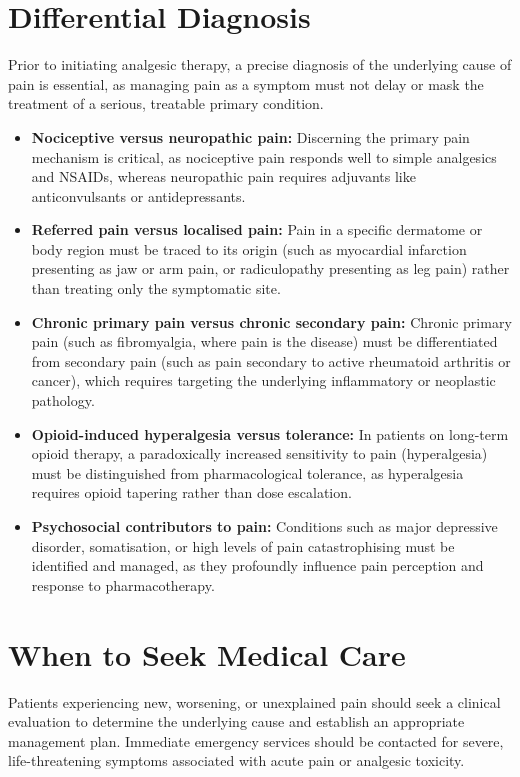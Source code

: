 \section*{Differential Diagnosis}
Prior to initiating analgesic therapy, a precise diagnosis of the underlying cause of pain is essential, as managing pain as a symptom must not delay or mask the treatment of a serious, treatable primary condition.
\begin{itemize}
    \item \textbf{Nociceptive versus neuropathic pain:} Discerning the primary pain mechanism is critical, as nociceptive pain responds well to simple analgesics and NSAIDs, whereas neuropathic pain requires adjuvants like anticonvulsants or antidepressants.
    \item \textbf{Referred pain versus localised pain:} Pain in a specific dermatome or body region must be traced to its origin (such as myocardial infarction presenting as jaw or arm pain, or radiculopathy presenting as leg pain) rather than treating only the symptomatic site.
    \item \textbf{Chronic primary pain versus chronic secondary pain:} Chronic primary pain (such as fibromyalgia, where pain is the disease) must be differentiated from secondary pain (such as pain secondary to active rheumatoid arthritis or cancer), which requires targeting the underlying inflammatory or neoplastic pathology.
    \item \textbf{Opioid-induced hyperalgesia versus tolerance:} In patients on long-term opioid therapy, a paradoxically increased sensitivity to pain (hyperalgesia) must be distinguished from pharmacological tolerance, as hyperalgesia requires opioid tapering rather than dose escalation.
    \item \textbf{Psychosocial contributors to pain:} Conditions such as major depressive disorder, somatisation, or high levels of pain catastrophising must be identified and managed, as they profoundly influence pain perception and response to pharmacotherapy.
\end{itemize}

\section*{When to Seek Medical Care}
Patients experiencing new, worsening, or unexplained pain should seek a clinical evaluation to determine the underlying cause and establish an appropriate management plan. Immediate emergency services should be contacted for severe, life-threatening symptoms associated with acute pain or analgesic toxicity.

